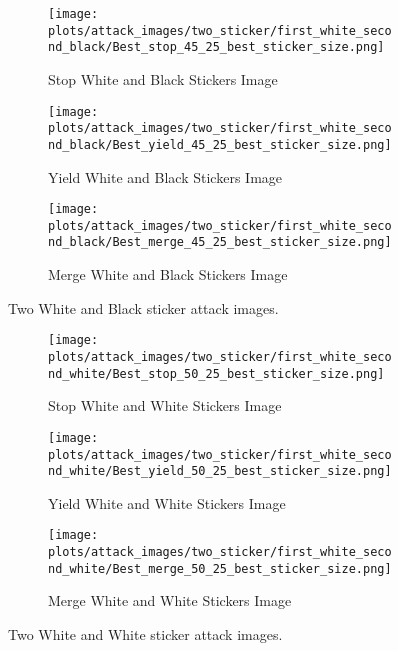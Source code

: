 \begin{figure*}[t]
    \begin{subfigure}[b]{0.25\textwidth}
        \centering
\texttt{[image: plots/attack\_images/two\_sticker/first\_white\_second\_black/Best\_stop\_45\_25\_best\_sticker\_size.png]}
        \caption{\small \centering Stop White and Black Stickers Image}
        \label{fig:Best_stop_white_black_two_sticker}
    \end{subfigure}
    \hfill
    \begin{subfigure}[b]{0.25\textwidth}
        \centering
         \texttt{[image: plots/attack\_images/two\_sticker/first\_white\_second\_black/Best\_yield\_45\_25\_best\_sticker\_size.png]}
        \caption{\small \centering Yield White and Black Stickers Image}
        \label{fig:Best_yield_white_black_two_sticker}
    \end{subfigure}
    \hfill
    \begin{subfigure}[b]{0.25\textwidth}
        \centering
  \texttt{[image: plots/attack\_images/two\_sticker/first\_white\_second\_black/Best\_merge\_45\_25\_best\_sticker\_size.png]}
        \caption{\small \centering Merge White and Black Stickers Image}
        \label{fig:Best_merge_white_black_two_sticker}
    \end{subfigure}
    \vspace{-1em}
    \caption{Two White and Black sticker attack images.}
    \label{fig:two_sticker_white_black_Images}
\end{figure*}


\begin{figure*}[h!]
    \begin{subfigure}[b]{0.25\textwidth}
        \centering
\texttt{[image: plots/attack\_images/two\_sticker/first\_white\_second\_white/Best\_stop\_50\_25\_best\_sticker\_size.png]}
        \caption{\small \centering Stop White and White Stickers Image}
        \label{fig:Best_stop_white_white_two_sticker}
    \end{subfigure}
    \hfill
    \begin{subfigure}[b]{0.25\textwidth}
        \centering
         \texttt{[image: plots/attack\_images/two\_sticker/first\_white\_second\_white/Best\_yield\_50\_25\_best\_sticker\_size.png]}
        \caption{\small \centering Yield White and White Stickers Image}
        \label{fig:Best_yield_white_white_two_sticker}
    \end{subfigure}
    \hfill
    \begin{subfigure}[b]{0.25\textwidth}
        \centering
 \texttt{[image: plots/attack\_images/two\_sticker/first\_white\_second\_white/Best\_merge\_50\_25\_best\_sticker\_size.png]}
        \caption{\small \centering Merge White and White Stickers Image}
        \label{fig:Best_merge_white_white_two_sticker}
    \end{subfigure}
    \vspace{-1em}
    \caption{Two White and White sticker attack images.}
    \label{fig:two_sticker_white_white_Images}
\end{figure*}

